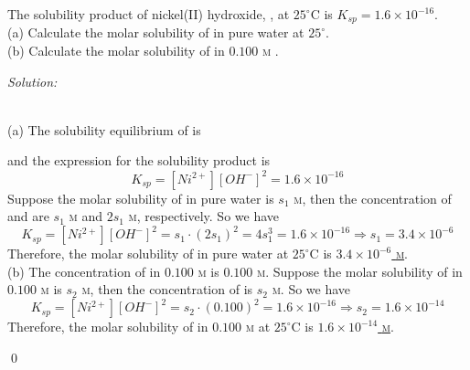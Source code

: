 \documentclass[12pt]{article}
\newenvironment{problem}[2][Problem]{\begin{trivlist}
\item[\hskip \labelsep {\bfseries #1}\hskip \labelsep {\bfseries #2.}]}{\end{trivlist}}
\newenvironment{sol}
    {\emph{Solution:}
    }
    {
    \qed
    }
\begin{document}
\begin{problem}{16.27}
The solubility product of nickel(II) hydroxide, , at $25^{\circ}$C is $K_{sp}=1.6\times10^{-16}$.\\
(a) Calculate the molar solubility of  in pure water at $25^{\circ}$.\\
(b) Calculate the molar solubility of  in $0.100$ \textsc{m} .
\end{problem}
\begin{sol}
\\(a) The solubility equilibrium of  is
\begin{center}
\end{center}
and the expression for the solubility product is
\[
K_{sp}=[Ni^{2+}][OH^-]^2=1.6\times10^{-16}
\]
Suppose the molar solubility of  in pure water is $s_1$ \textsc{m}, then the concentration of  and  are $s_1$ \textsc{m} and $2s_1$ \textsc{m}, respectively. So we have
\[
K_{sp}=[Ni^{2+}][OH^-]^2=s_1\cdot(2s_1)^2=4s_1^3=1.6\times10^{-16}\Longrightarrow s_1=3.4\times10^{-6}
\]
Therefore, the molar solubility of  in pure water at $25^{\circ}$C is \uline{$3.4\times10^{-6}$ \textsc{m}}.\\
(b) The concentration of  in $0.100$ \textsc{m}  is $0.100$ \textsc{m}. Suppose the molar solubility of  in $0.100$ \textsc{m}  is $s_2$ \textsc{m}, then the concentration of  is $s_2$ \textsc{m}. So we have
\[
K_{sp}=[Ni^{2+}][OH^-]^2=s_2\cdot(0.100)^2=1.6\times10^{-16}\Longrightarrow s_2=1.6\times10^{-14}
\]
Therefore, the molar solubility of  in $0.100$ \textsc{m}  at $25^{\circ}$C is \uline{$1.6\times10^{-14}$ \textsc{m}}.
\end{sol}
\end{document}
